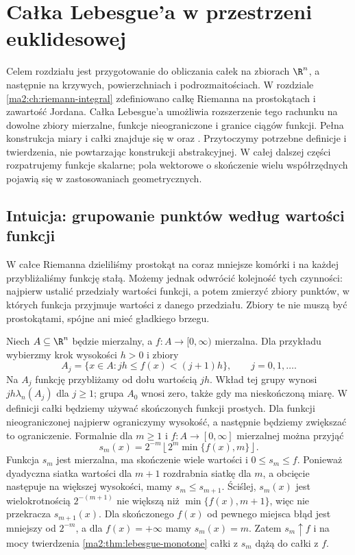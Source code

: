 \chapter{Całka Lebesgue'a w przestrzeni euklidesowej}
\label{ma2:ch:lebesgue-euclidean}

Celem rozdziału jest przygotowanie do obliczania
całek na zbiorach $\R^n$, a następnie na
krzywych, powierzchniach i podrozmaitościach.
W rozdziale \ref{ma2:ch:riemann-integral} zdefiniowano
całkę Riemanna na prostokątach i zawartość Jordana.
Całka Lebesgue'a umożliwia rozszerzenie tego
rachunku na dowolne zbiory mierzalne, funkcje
nieograniczone i granice ciągów funkcji.
Pełna konstrukcja miary i całki znajduje się w
oraz .
Przytoczymy potrzebne definicje i twierdzenia,
nie powtarzając konstrukcji abstrakcyjnej.
W całej dalszej części rozpatrujemy funkcje skalarne;
pola wektorowe o skończenie wielu współrzędnych
pojawią się w zastosowaniach geometrycznych.

\section{Intuicja: grupowanie punktów według wartości funkcji}

W całce Riemanna dzieliliśmy prostokąt
na coraz mniejsze komórki i na każdej
przybliżaliśmy funkcję stałą. Możemy jednak
odwrócić kolejność tych czynności: najpierw
ustalić przedziały wartości funkcji, a potem
zmierzyć zbiory punktów, w których funkcja
przyjmuje wartości z danego przedziału.
Zbiory te nie muszą być prostokątami,
spójne ani mieć gładkiego brzegu.

Niech $A\subseteq\R^n$ będzie mierzalny,
a $f:A\to[0,\infty)$ mierzalna.
Dla przykładu wybierzmy krok wysokości
$h>0$ i zbiory
\[
 A_j=\{x\in A:jh\le f(x)<(j+1)h\},
 \qquad j=0,1,\ldots.
\]
Na $A_j$ funkcję przybliżamy od dołu
wartością $jh$. Wkład tej grupy wynosi
$jh\lambda_n(A_j)$ dla $j\ge1$;
grupa $A_0$ wnosi zero, także gdy ma
nieskończoną miarę. W definicji całki
będziemy używać skończonych funkcji prostych.
Dla funkcji nieograniczonej najpierw
ograniczymy wysokość, a następnie
będziemy zwiększać to ograniczenie.
Formalnie dla $m\ge1$ i $f:A\to[0,\infty]$
mierzalnej można przyjąć
\[
 s_m(x)=2^{-m}\left\lfloor
  2^m\min\{f(x),m\}\right\rfloor.
\]
Funkcja $s_m$ jest mierzalna, ma skończenie
wiele wartości i $0\le s_m\le f$.
Ponieważ dyadyczna siatka wartości dla
$m+1$ rozdrabnia siatkę dla $m$, a obcięcie
następuje na większej wysokości, mamy
$s_m\le s_{m+1}$. Ściślej, $s_m(x)$
jest wielokrotnością $2^{-(m+1)}$ nie większą
niż $\min\{f(x),m+1\}$, więc nie przekracza
$s_{m+1}(x)$. Dla skończonego $f(x)$
od pewnego miejsca błąd jest mniejszy od
$2^{-m}$, a dla $f(x)=+\infty$ mamy $s_m(x)=m$.
Zatem $s_m\uparrow f$ i na mocy twierdzenia
\ref{ma2:thm:lebesgue-monotone}
całki z $s_m$ dążą do całki z $f$.

